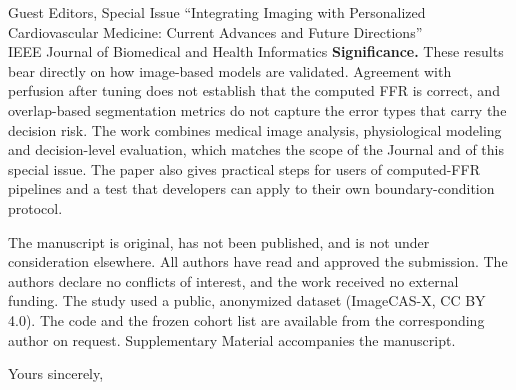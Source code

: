 \documentclass[10pt]{letter}
\begin{document}
\begin{letter}{Guest Editors, Special Issue ``Integrating Imaging with Personalized Cardiovascular Medicine: Current
Advances and Future Directions''\\IEEE Journal of Biomedical and Health Informatics}
\textbf{Significance.} These results bear directly on how image-based models are validated. Agreement with
perfusion after tuning does not establish that the computed FFR is correct, and overlap-based segmentation metrics do not capture the error types that
carry the decision risk. The work combines medical image analysis, physiological modeling and decision-level
evaluation, which matches the scope of the Journal and of this special issue. The paper also gives practical steps for users
of computed-FFR pipelines and a test that developers can apply to their own boundary-condition protocol.

The manuscript is original, has not been published, and is not under consideration elsewhere. All authors have read
and approved the submission. The authors declare no conflicts of interest, and the work received no external funding.
The study used a public, anonymized dataset (ImageCAS-X, CC BY 4.0). The code and the frozen cohort list are available
from the corresponding author on request. Supplementary Material accompanies the manuscript.

\closing{Yours sincerely,}
\end{letter}
\end{document}

